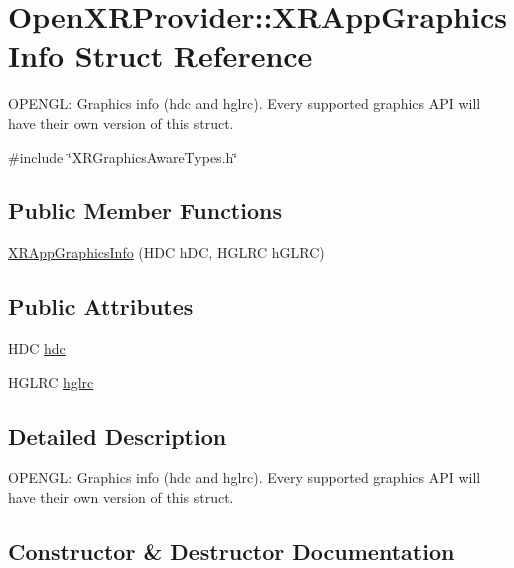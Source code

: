 \hypertarget{struct_open_x_r_provider_1_1_x_r_app_graphics_info}{}\section{Open\+X\+R\+Provider\+::X\+R\+App\+Graphics\+Info Struct Reference}
\label{struct_open_x_r_provider_1_1_x_r_app_graphics_info}


O\+P\+E\+N\+GL\+: Graphics info (hdc and hglrc). Every supported graphics A\+PI will have their own version of this struct.  




{\ttfamily \#include \char`\"{}X\+R\+Graphics\+Aware\+Types.\+h\char`\"{}}

\subsection*{Public Member Functions}
\begin{DoxyCompactItemize}
\item 
\mbox{\hyperlink{struct_open_x_r_provider_1_1_x_r_app_graphics_info_aa6ecf75f25316c6e424e3132fdb88d5a}{X\+R\+App\+Graphics\+Info}} (H\+DC h\+DC, H\+G\+L\+RC h\+G\+L\+RC)
\end{DoxyCompactItemize}
\subsection*{Public Attributes}
\begin{DoxyCompactItemize}
\item 
H\+DC \mbox{\hyperlink{struct_open_x_r_provider_1_1_x_r_app_graphics_info_a722bda7b4902806d4f1c0de5719e8b34}{hdc}}
\item 
H\+G\+L\+RC \mbox{\hyperlink{struct_open_x_r_provider_1_1_x_r_app_graphics_info_a657906fd43aa11d059d2f59f8a940749}{hglrc}}
\end{DoxyCompactItemize}


\subsection{Detailed Description}
O\+P\+E\+N\+GL\+: Graphics info (hdc and hglrc). Every supported graphics A\+PI will have their own version of this struct. 

\subsection{Constructor \& Destructor Documentation}
\mbox{\label{struct_open_x_r_provider_1_1_x_r_app_graphics_info_aa6ecf75f25316c6e424e3132fdb88d5a}} 
